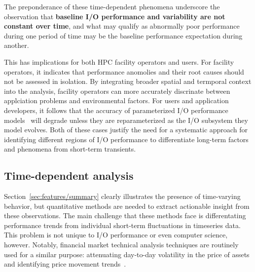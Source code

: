 The preponderance of these time-dependent phenomena underscore the observation that \textbf{baseline I/O performance and variability are not constant over time}, and
what may qualify as abnormally poor performance during one period of time may be the baseline performance expectation during another.

This has implications for both HPC facility operators and users.  For
facility operators, it indicates that performance anomolies and their root
causes should not be assessed in isolation. By integrating broader spatial and
termporal context into the analysis, facility operators can more accurately
discrinate between applciation problems and environmental factors.
For users and application developers, it follows that the accuracy of parameterized I/O performance models~\cite{Xie2012,Madireddy2017} will degrade unless they are reparameterized as the I/O subsystem they model evolves.
Both of these cases justify the need for a systematic approach for identifying different regions of I/O performance to differentiate long-term factors and phenomena from short-term transients.

\subsection{Time-dependent analysis} \label{sec:features/timedependent}

Section~\ref{sec:features/summary} clearly illustrates the presence of
time-varying behavior, but quantitative methods are needed to extract 
actionable insight from these observations.  The main challenge that these
methods face is differentating performance trends from individual short-term
fluctuations in timeseries data.
This problem is not unique to I/O performance or even computer science,
however.  Notably, financial market technical analysis techniques are
routinely used for a similar purpose: attenuating day-to-day volatility in
the price of assets and identifying price movement
trends~\cite{james1968monthly,gunasekarage2001profitability}.  

